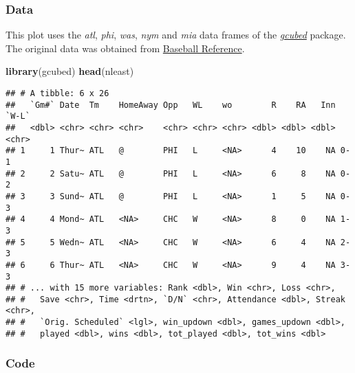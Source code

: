 \documentclass[]{book}
\newenvironment{Shaded}{\begin{snugshade}}{\end{snugshade}}
\newcommand{\KeywordTok}[1]{\textcolor[rgb]{0.13,0.29,0.53}{\textbf{#1}}}
\newcommand{\NormalTok}[1]{#1}
\begin{document}
\hypertarget{nleastbarsdata}{%
\subsubsection*{Data}\label{nleastbarsdata}}

This plot uses the \emph{atl}, \emph{phi}, \emph{was}, \emph{nym} and \emph{mia} data frames of the \protect\hyperlink{gcubed}{\emph{gcubed}} package.
The original data was obtained from
\href{https://www.baseball-reference.com/leagues/NL/2019-standings.shtml\#all_standings_E}{Baseball Reference}.

\begin{Shaded}
\begin{Highlighting}[]
\KeywordTok{library}\NormalTok{(gcubed)}
\KeywordTok{head}\NormalTok{(nleast)}
\end{Highlighting}
\end{Shaded}

\begin{verbatim}
## # A tibble: 6 x 26
##   `Gm#` Date  Tm    HomeAway Opp   WL    wo        R    RA   Inn `W-L`
##   <dbl> <chr> <chr> <chr>    <chr> <chr> <chr> <dbl> <dbl> <dbl> <chr>
## 1     1 Thur~ ATL   @        PHI   L     <NA>      4    10    NA 0-1  
## 2     2 Satu~ ATL   @        PHI   L     <NA>      6     8    NA 0-2  
## 3     3 Sund~ ATL   @        PHI   L     <NA>      1     5    NA 0-3  
## 4     4 Mond~ ATL   <NA>     CHC   W     <NA>      8     0    NA 1-3  
## 5     5 Wedn~ ATL   <NA>     CHC   W     <NA>      6     4    NA 2-3  
## 6     6 Thur~ ATL   <NA>     CHC   W     <NA>      9     4    NA 3-3  
## # ... with 15 more variables: Rank <dbl>, Win <chr>, Loss <chr>,
## #   Save <chr>, Time <drtn>, `D/N` <chr>, Attendance <dbl>, Streak <chr>,
## #   `Orig. Scheduled` <lgl>, win_updown <dbl>, games_updown <dbl>,
## #   played <dbl>, wins <dbl>, tot_played <dbl>, tot_wins <dbl>
\end{verbatim}

\hypertarget{nleastbarscode}{%
\subsubsection*{Code}\label{nleastbarscode}}
\end{document}
